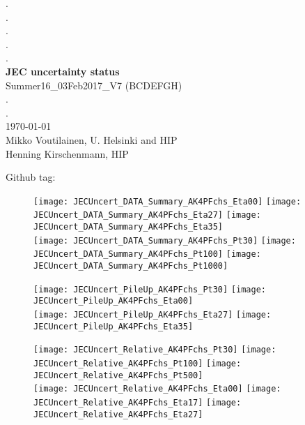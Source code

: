 \documentclass[landscape,10pt]{beamer} %
\begin{document}
\begin{centering}
{. }\\
{. }\\
{. }\\
{. }\\
{. }\\
{\bf JEC uncertainty status}\\
Summer16\_03Feb2017\_V7 (BCDEFGH)\\
.\\
.\\
\today\\
Mikko Voutilainen, U. Helsinki and HIP\\
Henning Kirschenmann, HIP\\
\end{centering}

\newpage

Github tag:

\newpage

\begin{figure}[p]
\centering
  \texttt{[image: JECUncert\_DATA\_Summary\_AK4PFchs\_Eta00]}
  \texttt{[image: JECUncert\_DATA\_Summary\_AK4PFchs\_Eta27]}
  \texttt{[image: JECUncert\_DATA\_Summary\_AK4PFchs\_Eta35]}\\
  \texttt{[image: JECUncert\_DATA\_Summary\_AK4PFchs\_Pt30]}
  \texttt{[image: JECUncert\_DATA\_Summary\_AK4PFchs\_Pt100]}
  \texttt{[image: JECUncert\_DATA\_Summary\_AK4PFchs\_Pt1000]}
\end{figure}

\newpage

\begin{figure}[p]
\centering
  \texttt{[image: JECUncert\_PileUp\_AK4PFchs\_Pt30]}
  \texttt{[image: JECUncert\_PileUp\_AK4PFchs\_Eta00]}\\
  \texttt{[image: JECUncert\_PileUp\_AK4PFchs\_Eta27]}
  \texttt{[image: JECUncert\_PileUp\_AK4PFchs\_Eta35]}
\end{figure}

\newpage 

\begin{figure}[p]
\centering
  \texttt{[image: JECUncert\_Relative\_AK4PFchs\_Pt30]}
  \texttt{[image: JECUncert\_Relative\_AK4PFchs\_Pt100]}
  \texttt{[image: JECUncert\_Relative\_AK4PFchs\_Pt500]}\\
  \texttt{[image: JECUncert\_Relative\_AK4PFchs\_Eta00]}
  \texttt{[image: JECUncert\_Relative\_AK4PFchs\_Eta17]}
  \texttt{[image: JECUncert\_Relative\_AK4PFchs\_Eta27]}
\end{figure}
\end{document}
